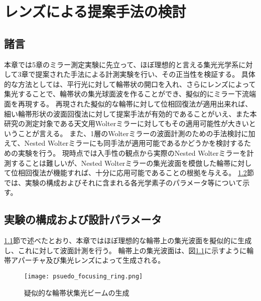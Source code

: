 \chapter{レンズによる提案手法の検討}
\thispagestyle{empty}
\label{chap4}
\graphicspath{{chap4/figure/}}
\minitoc

\newpage


\section{諸言}
\label{chap4_introduction}

本章では5章のミラー測定実験に先立って、ほぼ理想的と言える集光光学系に対して3章で提案された手法による計測実験を行い、その正当性を検証する。
具体的な方法としては、平行光に対して輪帯状の開口を入れ、さらにレンズによって集光することで、輪帯状の集光球面波を作ることができ、擬似的にミラー下流端面を再現する。
再現された擬似的な輪帯に対して位相回復法が適用出来れば、細い輪帯形状の波面回復法に対して提案手法が有効的であることがいえ、また本研究の測定対象である天文用Wolterミラーに対してもその適用可能性が大きいということが言える。
また、1層のWolterミラーの波面計測のための手法検討に加えて、Nested Wolterミラーにも同手法が適用可能であるかどうかを検討するための実験を行う。
現時点では入手性の観点から実際のNested Wolterミラーを計測することは難しいが、Nested Wolterミラーの集光波面を模倣した輪帯に対して位相回復法が機能すれば、十分に応用可能であることの根拠を与える。
\ref{chap4_experiment_setup}節では、実験の構成およびそれに含まれる各光学素子のパラメータ等について示す。


\clearpage
\newpage

\section{実験の構成および設計パラメータ}
\label{chap4_experiment_setup}

\ref{chap4_introduction}節で述べたとおり、本章ではほぼ理想的な輪帯上の集光波面を擬似的に生成し、これに対して波面計測を行う。
輪帯上の集光波面は、図\ref{fig:psuedo_focusing_ring_model}に示すように輪帯アパーチャ及び集光レンズによって生成される。

\begin{figure}[!ht]
\centering
\texttt{[image: psuedo\_focusing\_ring.png]}
\caption{疑似的な輪帯状集光ビームの生成}
\label{fig:psuedo_focusing_ring_model}
\end{figure}

